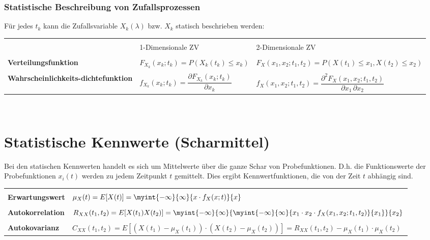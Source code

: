 		\subsubsection{Statistische Beschreibung von Zufallsprozessen}
			Für jedes $t_k$ kann die Zufallsvariable $X_k(\lambda)$ bzw. $X_k$ statisch beschrieben werden:\\[0.2cm]
			\begin{tabularx}{\textwidth}{|p{4cm}|p{5.25cm}|p{7.75cm}|}
			\hline&&\\[-0.3cm]
				& 1-Dimensionale ZV & 2-Dimensionale ZV\\[0.15cm]
			\hline&&\\[-0.3cm]
				\textbf{Verteilungsfunktion} & $F_{X_k}(x_k;t_k) = P(X_k(t_k)\leq x_k)$ & $F_{X}(x_1,x_2;t_1,t_2) = P(X(t_1)\leq x_1,X(t_2)\leq x_2)$\\[0.2cm]
			\hline&&\\[-0.3cm]
				\multicolumn{1}{|m{4cm}|}{\textbf{Wahrscheinlichkeits-\newline dichtefunktion}} & $f_{X_k}(x_k;t_k) = \dfrac{\partial F_{X_k}(x_k;t_k)}{\partial x_k}$ & $f_{X}(x_1,x_2;t_1,t_2) = \dfrac{\partial^2 F_{X}(x_1,x_2;t_1,t_2)}{\partial x_1\,\partial x_2}$\\[0.35cm]
			\hline
			\end{tabularx}\\[0.2cm]

		\section{Statistische Kennwerte (Scharmittel)}
			Bei den statischen Kennwerten handelt es sich um Mittelwerte über die ganze Schar von Probefunktionen. D.h. die Funktionswerte der Probefunktionen $x_i(t)$ werden zu jedem Zeitpunkt $t$ gemittelt. Dies ergibt Kennwertfunktionen, die von der Zeit $t$ abhängig sind.\\[0.2cm]
			\begin{tabular}{|l|l|}
			\hline&\\[-0.35cm]
				\textbf{Erwartungswert} & $\mu_X(t) = E[X(t)] = \myint{-\infty}{\infty}{x\cdot f_X(x;t)}{x}$\\[0.35cm]
			\hline&\\[-0.35cm]
				\textbf{Autokorrelation} & $R_{XX}(t_1,t_2)= E[X(t_1)X(t_2)] = \myint{-\infty}{\infty}{\myint{-\infty}{\infty}{x_1\cdot x_2\cdot f_X (x_1,x_2;t_1,t_2)}{x_1}}{x_2}$\\[0.35cm]
			\hline&\\[-0.3cm]
				\textbf{Autokovarianz} & $C_{XX}(t_1,t_2) = E[(X(t_1)-\mu_X(t_1))\cdot (X(t_2)-\mu_X(t_2))] = R_{XX}(t_1,t_2)-\mu_X(t_1)\cdot\mu_X(t_2)$\\[0.2cm]
			\hline
			\end{tabular}\\[0.2cm]

